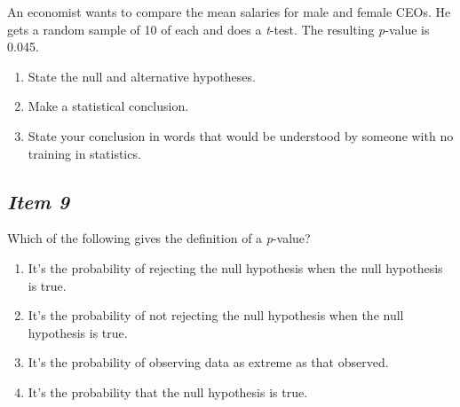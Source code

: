 An economist wants to compare  the mean salaries for male and female CEOs. He gets a random sample of 10 of each and does a \textit{t}-test. The resulting \textit{p}-value is 0.045.


\begin{enumerate} [leftmargin=1cm, itemsep=.2em]





\item State the null and alternative hypotheses.


\item Make a statistical conclusion.


\item State your conclusion in words that would be understood by someone with no training in statistics.


\end{enumerate}











\subsection{\textbf{\textit{Item 9}}}


Which of the following gives the definition of a \textit{p}-value?


\renewcommand{\labelenumi}{\Alph{enumi}.}


\begin{enumerate} [leftmargin=1cm, itemsep=.2em]




\item It's the probability of rejecting the null hypothesis when the null hypothesis is true.


\item It's the probability of not rejecting the null hypothesis when the null hypothesis is true.


\item It's the probability of observing data as extreme as that observed.


\item It's the probability that the null hypothesis is true.


\end{enumerate}











